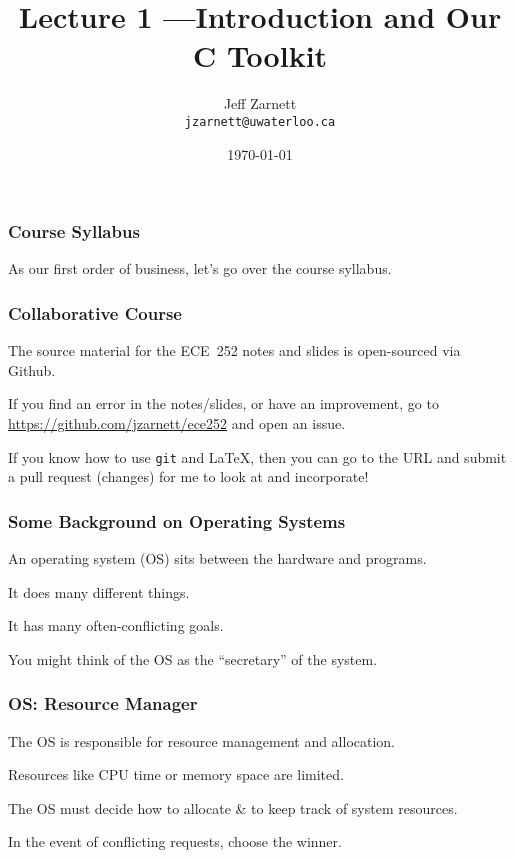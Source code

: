 

\title{Lecture 1 ---Introduction and Our C Toolkit }

\author{Jeff Zarnett \\ \small \texttt{jzarnett@uwaterloo.ca}}
\date{\today}




\begin{frame}
  \titlepage

 \end{frame}

\begin{frame}
\frametitle{Course Syllabus}

As our first order of business, let's go over the course syllabus.

\end{frame}

\begin{frame}
\frametitle{Collaborative Course}

The source material for the ECE~252 notes and slides is open-sourced via Github. 

If you find an error in the notes/slides, or have an improvement, go to \url{https://github.com/jzarnett/ece252} and open an issue. 

If you know how to use \texttt{git} and \LaTeX, then you can go to the URL and submit a pull request (changes) for me to look at and incorporate!


\end{frame}

\begin{frame}
\frametitle{Some Background on Operating Systems}

An operating system (OS) sits between the hardware and programs.

It does many different things.

It has many often-conflicting goals.

You might think of the OS as the ``secretary'' of the system.

\end{frame}

\begin{frame}
\frametitle{OS: Resource Manager}

The OS is responsible for resource management and allocation.

Resources like CPU time or memory space are limited.

The OS must decide how to allocate \& to keep track of system resources.

In the event of conflicting requests, choose the winner.


\end{frame}

